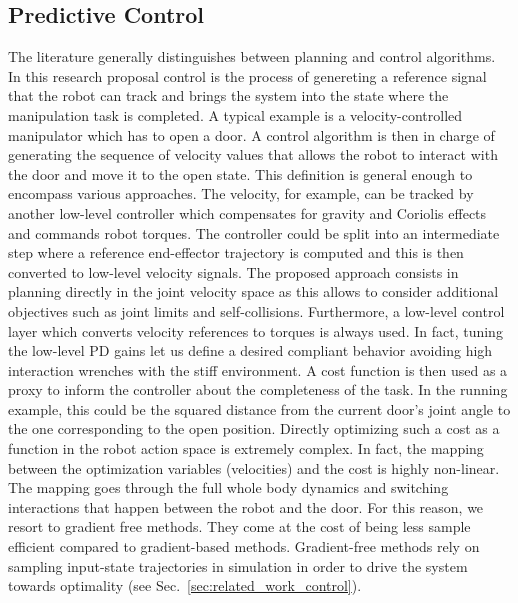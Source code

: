 \subsection{Predictive Control}
The literature generally distinguishes between planning and control algorithms. In this research proposal control is the process of genereting a reference signal that the robot can track and brings the system into the state where the manipulation task is completed. A typical example is a velocity-controlled manipulator which has to open a door. A control algorithm is then in charge of generating the sequence of velocity values that allows the robot to interact with the door and move it to the open state. This definition is general enough to encompass various approaches. The velocity, for example, can be tracked by another low-level controller which compensates for gravity and Coriolis effects and commands robot torques. The controller could be split into an intermediate step where a reference end-effector trajectory is computed and this is then converted to low-level velocity signals. The proposed approach consists in planning directly in the joint velocity space as this allows to consider additional objectives such as joint limits and self-collisions. Furthermore, a low-level control layer which converts velocity references to torques is always used. In fact, tuning the low-level PD gains let us define a desired compliant behavior avoiding high interaction wrenches with the stiff environment. 
A cost function is then used as a proxy to inform the controller about the completeness of the task. In the running example, this could be the squared distance from the current door's joint angle to the one corresponding to the open position. 
Directly optimizing such a cost as a function in the robot action space is extremely complex. In fact, the mapping between the optimization variables (velocities) and the cost is highly non-linear. The mapping goes through the full whole body dynamics and switching interactions that happen between the robot and the door. For this reason, we resort to gradient free methods. They come at the cost of being less sample efficient compared to gradient-based methods. Gradient-free methods rely on sampling input-state trajectories in simulation in order to drive the system towards optimality (see Sec.~\ref{sec:related_work_control}).

